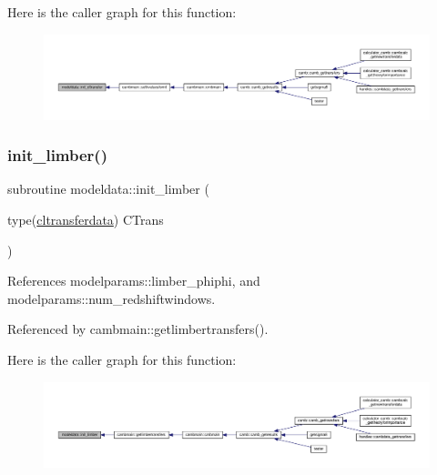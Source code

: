 Here is the caller graph for this function\+:
\nopagebreak
\begin{figure}[H]
\begin{center}
\leavevmode
\includegraphics[width=350pt]{namespacemodeldata_aafb7870d44b0d4146bad72673d70223f_icgraph}
\end{center}
\end{figure}
\mbox{\label{namespacemodeldata_af9818c2b8e3f5e17f6d1a309726fc12e}} 
\subsubsection{\texorpdfstring{init\+\_\+limber()}{init\_limber()}}
{\footnotesize\ttfamily subroutine modeldata\+::init\+\_\+limber (\begin{DoxyParamCaption}\item[{type(\mbox{\hyperlink{structmodeldata_1_1cltransferdata}{cltransferdata}})}]{C\+Trans }\end{DoxyParamCaption})}



References modelparams\+::limber\+\_\+phiphi, and modelparams\+::num\+\_\+redshiftwindows.



Referenced by cambmain\+::getlimbertransfers().

Here is the caller graph for this function\+:
\nopagebreak
\begin{figure}[H]
\begin{center}
\leavevmode
\includegraphics[width=350pt]{namespacemodeldata_af9818c2b8e3f5e17f6d1a309726fc12e_icgraph}
\end{center}
\end{figure}
\mbox{\label{namespacemodeldata_a4a66d258c52f2b7639e92ce04f7047ff}} 
